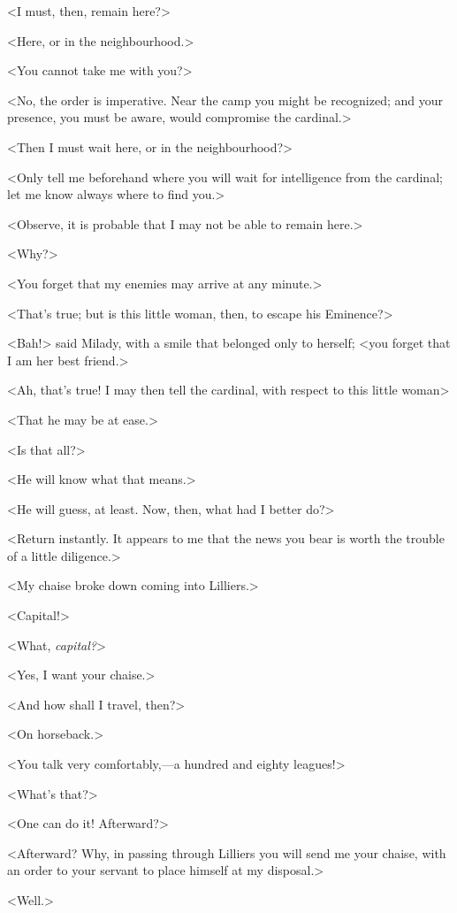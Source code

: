 <I must, then, remain here?> 

<Here, or in the neighbourhood.> 

<You cannot take me with you?> 

<No, the order is imperative. Near the camp you might be recognized; and your presence, you must be aware, would compromise the cardinal.> 

<Then I must wait here, or in the neighbourhood?> 

<Only tell me beforehand where you will wait for intelligence from the cardinal; let me know always where to find you.> 

<Observe, it is probable that I may not be able to remain here.> 

<Why?> 

<You forget that my enemies may arrive at any minute.> 

<That's true; but is this little woman, then, to escape his Eminence?> 

<Bah!> said Milady, with a smile that belonged only to herself; <you forget that I am her best friend.> 

<Ah, that's true! I may then tell the cardinal, with respect to this little woman\longdash> 

<That he may be at ease.> 

<Is that all?> 

<He will know what that means.> 

<He will guess, at least. Now, then, what had I better do?> 

<Return instantly. It appears to me that the news you bear is worth the trouble of a little diligence.> 

<My chaise broke down coming into Lilliers.> 

<Capital!> 

<What, \textit{capital?}> 

<Yes, I want your chaise.> 

<And how shall I travel, then?> 

<On horseback.> 

<You talk very comfortably,---a hundred and eighty leagues!> 

<What's that?> 

<One can do it! Afterward?> 

<Afterward? Why, in passing through Lilliers you will send me your chaise, with an order to your servant to place himself at my disposal.> 

<Well.> 

